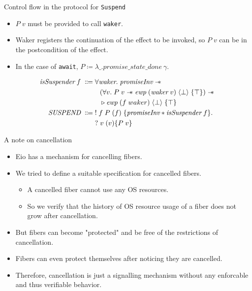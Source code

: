 \documentclass[aspectratio=43]{beamer}
\newcommand{\ocaml}[1]{\texttt{#1}}
\newcommand{\wand}{\mathrel{-\mkern-6mu*}}
\newcommand{\esuspend}{\ocaml{Suspend}}
\newcommand{\pinv}{\textit{promiseInv}}
\begin{document}
\begin{frame}[fragile]{Control flow in the protocol for \esuspend{}}
    \begin{itemize}
        \item \(P\; v\) must be provided to call \ocaml{waker}.
        \item Waker registers the continuation of the effect to be invoked, so \(P\; v\) can be in the postcondition of the effect.
        \item In the case of \ocaml{await}, \(P \coloneqq \lambda \_. promise\_state\_done~\gamma\).
    \end{itemize}
    \begin{align*}
        \textit{isSuspender}\; f\; \Coloneqq & \; \forall \textit{waker}.\; \pinv{} \wand{}                                                                      \\
                                             & \quad (\forall v.\; P\; v \wand{} \textit{ewp}\; (\textit{waker}\; v)\; \langle \bot \rangle\; \{\top \}) \wand{} \\
                                             & \quad \triangleright \textit{ewp}\; (f\; waker)\; \langle \bot \rangle\; \{ \top \}                               \\
        \textit{SUSPEND}\;         \Coloneqq & \; !\; f\; P\; (f)\; \{ \pinv{} \ast \textit{isSuspender}\; f \}.                                                 \\
                                             & \;?\; v\; (v) \{ P\; v \}
    \end{align*}
\end{frame}


\begin{frame}{A note on cancellation}
    \begin{itemize}
        \item Eio has a mechanism for cancelling fibers.
        \item We tried to define a suitable specification for cancelled fibers.
              \begin{itemize}
                  \item A cancelled fiber cannot use any OS resources.
                  \item So we verify that the history of OS resource usage of a fiber does not grow after cancellation.
              \end{itemize}
        \item But fibers can become "protected" and be free of the restrictions of cancellation.
        \item Fibers can even protect themselves after noticing they are cancelled.
        \item Therefore, cancellation is just a signalling mechanism without any enforcable and thus verifiable behavior.
    \end{itemize}
\end{frame}
\end{document}
